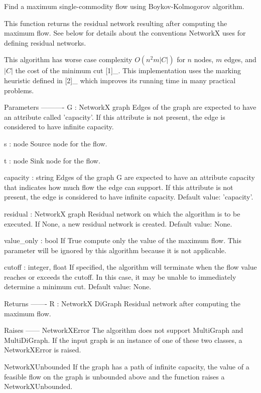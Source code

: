 \begin{DoxyVerb}Find a maximum single-commodity flow using Boykov-Kolmogorov algorithm.

This function returns the residual network resulting after computing
the maximum flow. See below for details about the conventions
NetworkX uses for defining residual networks.

This algorithm has worse case complexity $O(n^2 m |C|)$ for $n$ nodes, $m$
edges, and $|C|$ the cost of the minimum cut [1]_. This implementation
uses the marking heuristic defined in [2]_ which improves its running
time in many practical problems.

Parameters
----------
G : NetworkX graph
    Edges of the graph are expected to have an attribute called
    'capacity'. If this attribute is not present, the edge is
    considered to have infinite capacity.

s : node
    Source node for the flow.

t : node
    Sink node for the flow.

capacity : string
    Edges of the graph G are expected to have an attribute capacity
    that indicates how much flow the edge can support. If this
    attribute is not present, the edge is considered to have
    infinite capacity. Default value: 'capacity'.

residual : NetworkX graph
    Residual network on which the algorithm is to be executed. If None, a
    new residual network is created. Default value: None.

value_only : bool
    If True compute only the value of the maximum flow. This parameter
    will be ignored by this algorithm because it is not applicable.

cutoff : integer, float
    If specified, the algorithm will terminate when the flow value reaches
    or exceeds the cutoff. In this case, it may be unable to immediately
    determine a minimum cut. Default value: None.

Returns
-------
R : NetworkX DiGraph
    Residual network after computing the maximum flow.

Raises
------
NetworkXError
    The algorithm does not support MultiGraph and MultiDiGraph. If
    the input graph is an instance of one of these two classes, a
    NetworkXError is raised.

NetworkXUnbounded
    If the graph has a path of infinite capacity, the value of a
    feasible flow on the graph is unbounded above and the function
    raises a NetworkXUnbounded.


\end{DoxyVerb}
